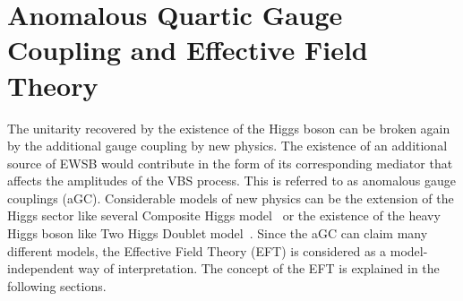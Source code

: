 \section{Anomalous Quartic Gauge Coupling and Effective Field Theory}
The unitarity recovered by the existence of the Higgs boson can be broken again by the additional gauge coupling by new physics. 
The existence of an additional source of EWSB would contribute in the form of its corresponding mediator that affects the amplitudes of the VBS process.
This is referred to as anomalous gauge couplings (aGC). 
Considerable models of new physics can be the extension of the Higgs sector like several Composite Higgs model~\cite{} or the existence of the heavy Higgs boson like Two Higgs Doublet model~\cite{}.
Since the aGC can claim many different models, the Effective Field Theory (EFT) is considered as a model-independent way of interpretation. 
The concept of the EFT is explained in the following sections.
